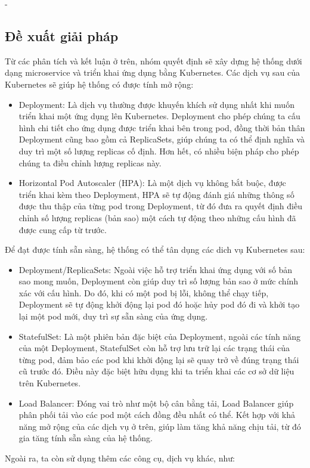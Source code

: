 \begin {list} {-}{}
\subsection{Đề xuất giải pháp}
\noindent Từ các phân tích và kết luận ở trên, nhóm quyết định sẽ xây dựng hệ thống dưới dạng microservice và triển khai ứng dụng bằng Kubernetes. Các dịch vụ sau của Kubernetes sẽ giúp hệ thống có được tính mở rộng:
\begin{itemize}
    \item Deployment: Là dịch vụ thường được khuyến khích sử dụng nhất khi muốn triển khai một ứng dụng lên Kubernetes. Deployment cho phép chúng ta cấu hình chi tiết cho ứng dụng được triển khai bên trong pod, đồng thời bản thân Deployment cũng bao gồm cả ReplicaSets, giúp chúng ta có thể định nghĩa và duy trì một số lượng replicas cố định. Hơn hết, có nhiều biện pháp cho phép chúng ta điều chỉnh lượng replicas này.
    \item Horizontal Pod Autoscaler (HPA): Là một dịch vụ không bắt buộc, được triển khai kèm theo Deployment, HPA sẽ tự động đánh giá những thông số được thu thập của từng pod trong Deployment, từ đó đưa ra quyết định điều chỉnh số lượng replicas (bản sao) một cách tự động theo những cấu hình đã được cung cấp từ trước.
\end{itemize}
Để đạt được tính sẵn sàng, hệ thống có thể tân dụng các dich vụ Kubernetes sau:
\begin{itemize}
    \item Deployment/ReplicaSets: Ngoài việc hỗ trợ triển khai ứng dụng với số bản sao mong muốn, Deployment còn giúp duy trì số lượng bản sao ở mức chính xác với cấu hình. Do đó, khi có một pod bị lỗi, không thể chạy tiếp, Deployment sẽ tự động khởi động lại pod đó hoặc hủy pod đó đi và khởi tạo lại một pod mới, duy trì sự sẵn sàng của ứng dụng.
    \item StatefulSet: Là một phiên bản đặc biệt của Deployment, ngoài các tính năng của một Deployment, StatefulSet còn hỗ trợ lưu trữ lại các trạng thái của từng pod, đảm bảo các pod khi khởi động lại sẽ quay trở về đúng trạng thái cũ trước đó. Điều này đặc biệt hữu dụng khi ta triển khai các cơ sở dữ liệu trên Kubernetes.
    \item Load Balancer: Đóng vai trò như một bộ cân bằng tải, Load Balancer giúp phân phối tải vào các pod một cách đồng đều nhất có thể. Kết hợp với khả năng mở rộng của các dịch vụ ở trên, giúp làm tăng khả năng chịu tải, từ đó gia tăng tính sẵn sàng của hệ thống.
\end{itemize}
Ngoài ra, ta còn sử dụng thêm các công cụ, dịch vụ khác, như:

\end{list}

